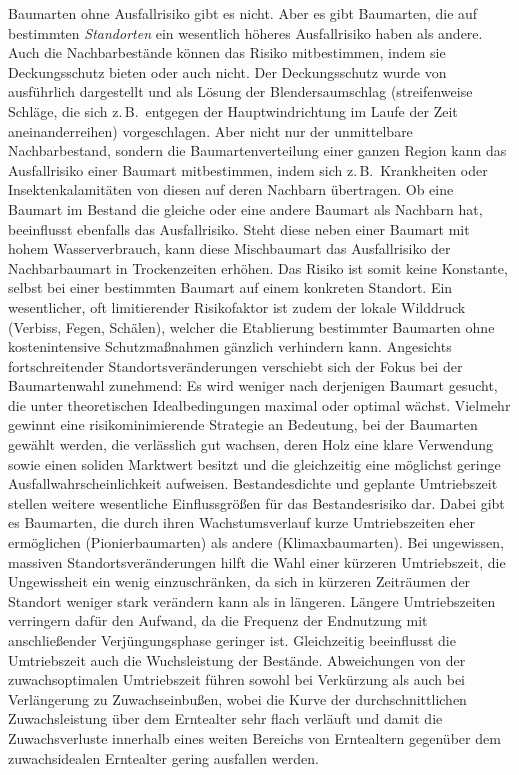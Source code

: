 \documentclass[twocolumn]{scrartcl}
\begin{document}
Baumarten ohne Ausfallrisiko gibt es nicht. Aber es gibt Baumarten,
die auf bestimmten \emph{Standorten} ein wesentlich höheres
Ausfallrisiko haben als andere. Auch die Nachbarbestände können das
Risiko mitbestimmen, indem sie Deckungsschutz bieten oder auch nicht.
Der Deckungsschutz wurde von
\cite{wagner1923DerBlendersaumschlagUndSeinSystem} ausführlich
dargestellt und als Lösung der Blendersaumschlag (streifenweise
Schläge, die sich z.\,B.\ entgegen der Hauptwindrichtung im Laufe der
Zeit aneinanderreihen) vorgeschlagen. Aber nicht nur der unmittelbare
Nachbarbestand, sondern die Baumartenverteilung einer ganzen Region
kann das Ausfallrisiko einer Baumart mitbestimmen, indem sich z.\,B.\
Krankheiten oder Insektenkalamitäten von diesen auf deren Nachbarn
übertragen. Ob eine Baumart im Bestand die gleiche oder eine
andere Baumart als Nachbarn hat, beeinflusst ebenfalls das
Ausfallrisiko. Steht diese neben einer Baumart mit hohem
Wasserverbrauch, kann diese Mischbaumart das Ausfallrisiko der
Nachbarbaumart in Trockenzeiten erhöhen. Das Risiko ist somit keine
Konstante, selbst bei einer bestimmten Baumart auf einem konkreten
Standort. Ein wesentlicher, oft limitierender Risikofaktor ist zudem
der lokale Wilddruck (Verbiss, Fegen, Schälen), welcher die Etablierung
bestimmter Baumarten ohne kostenintensive Schutzmaßnahmen gänzlich
verhindern kann. Angesichts fortschreitender Standortsveränderungen
verschiebt sich der Fokus bei der Baumartenwahl zunehmend: Es wird weniger
nach derjenigen Baumart gesucht, die unter theoretischen Idealbedingungen
maximal oder optimal wächst. Vielmehr gewinnt eine risikominimierende
Strategie an Bedeutung, bei der Baumarten gewählt werden, die verlässlich
gut wachsen, deren Holz eine klare Verwendung sowie einen soliden Marktwert
besitzt und die gleichzeitig eine möglichst geringe Ausfallwahrscheinlichkeit
aufweisen. Bestandesdichte und geplante Umtriebszeit stellen weitere
wesentliche Einflussgrößen für das Bestandesrisiko dar. Dabei gibt es
Baumarten, die durch ihren Wachstumsverlauf kurze Umtriebszeiten eher
ermöglichen (Pionierbaumarten) als andere (Klimaxbaumarten). Bei
ungewissen, massiven Standortsveränderungen hilft die Wahl einer
kürzeren Umtriebszeit, die Ungewissheit ein wenig einzuschränken, da
sich in kürzeren Zeiträumen der Standort weniger stark verändern kann
als in längeren. Längere Umtriebszeiten verringern dafür den Aufwand,
da die Frequenz der Endnutzung mit anschließender Verjüngungsphase
geringer ist. Gleichzeitig beeinflusst die Umtriebszeit auch die
Wuchsleistung der Bestände. Abweichungen von der zuwachsoptimalen
Umtriebszeit führen sowohl bei Verkürzung als auch bei Verlängerung zu
Zuwachseinbußen, wobei die Kurve der durchschnittlichen Zuwachsleistung über dem Erntealter sehr flach verläuft und damit die Zuwachsverluste innerhalb eines weiten Bereichs von Erntealtern gegenüber dem zuwachsidealen Erntealter gering ausfallen werden.
\end{document}
